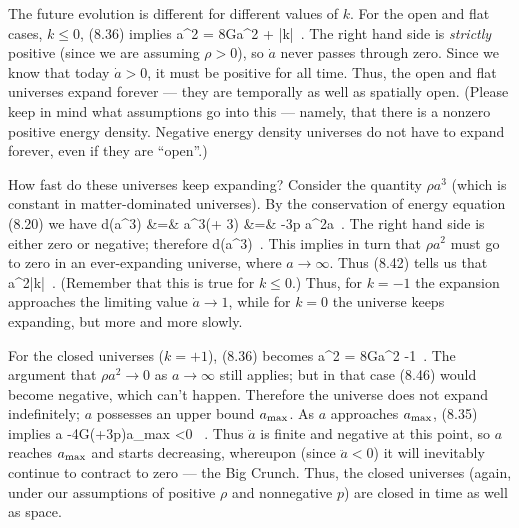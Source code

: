 The future evolution is different for different values of $k$.
For the open and flat cases, $k\leq 0$, (8.36) implies
\be
  \dot a^2 = {{8\pi G}}\rho a^2 + |k|\ .\label{8.42}
\ee
The right hand side is {\it strictly} positive (since we are
assuming $\rho>0$), so $\dot a$ never passes through zero.  Since
we know that today $\dot a>0$, it must be positive for all time.
Thus, the open and flat universes expand forever --- they are
temporally as well as spatially open.  (Please keep
in mind what assumptions go into this --- namely, that there
is a nonzero positive energy density.  Negative energy density
universes do not have to expand forever, even if they are ``open''.)

How fast do these universes keep expanding?  Consider the
quantity $\rho a^3$ (which is constant in matter-dominated
universes).  By the conservation of energy equation (8.20) we have
\bea
  {{d}}(\rho a^3) &=& 
  a^3\left(\dot\rho + 3\right)\cr
  &=&  -3p a^2\dot a\ .\label{8.43}
\eea
The right hand side is either zero or negative; therefore
\be
  {{d}}(\rho a^3)\ .\label{8.44}
\ee
This implies in turn that $\rho a^2$ must go to zero in an
ever-expanding universe, where $a\rightarrow\infty$.  Thus (8.42)
tells us that
\be
  \dot a^2\rightarrow |k|\ .\label{8.45}
\ee
(Remember that this is true for $k\leq 0$.)  Thus, for $k=-1$
the expansion approaches the limiting value $\dot a\rightarrow 1$,
while for $k=0$ the universe keeps expanding, but more and more slowly.

For the closed universes ($k=+1$), (8.36) becomes
\be
  \dot a^2 = {{8\pi G}}\rho a^2 -1\ .\label{8.46}
\ee
The argument that $\rho a^2\rightarrow 0$ as $a\rightarrow\infty$
still applies; but in that case (8.46) would become negative, which
can't happen.  Therefore the universe does not expand indefinitely;
$a$ possesses an upper bound $a_{\rm max}$.  As $a$ approaches
$a_{\rm max}$, (8.35) implies
\be
  \ddot a \rightarrow -{{4\pi G}}(\rho +3p)a_{\rm max} <0
  \ .\label{8.47}
\ee
Thus $\ddot a$ is finite and negative at this point, so $a$ reaches
$a_{\rm max}$ and starts decreasing, whereupon (since $\ddot a <0$)
it will inevitably continue to contract to zero --- the Big Crunch.
Thus, the closed universes (again, under our assumptions of
positive $\rho$ and nonnegative $p$) are closed in time as well
as space.

\begin{figure}[h]
  \centerline{
  }
\end{figure}

